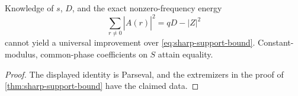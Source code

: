 \begin{corollary}
\label{cor:mean-square-insufficient}
Knowledge of \(s\), \(D\), and the exact nonzero-frequency energy
\[
 \sum_{r\ne0}|\widehat A(r)|^2=qD-|Z|^2
\]
cannot yield a universal improvement over
\eqref{eq:sharp-support-bound}.  Constant-modulus, common-phase
coefficients on \(S\) attain equality.
\end{corollary}

\begin{proof}
The displayed identity is Parseval, and the extremizers in the proof
of \cref{thm:sharp-support-bound} have the claimed data.
\end{proof}
